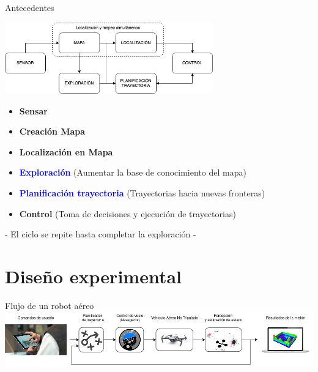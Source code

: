 \documentclass[24pt,aspectratio=169]{beamer}
\begin{document}
\begin{frame}{Antecedentes}

  \centering
  \bigskip %
  \includegraphics[width=9cm]{exploracion}\\
  
  \begin{itemize}
  \item \textbf{Sensar}
  \item \textbf{Creación Mapa} 
  \item \textbf{Localización en Mapa}
  \item \textbf{\textcolor{blue}{Exploración}} (Aumentar la base de conocimiento del mapa)
  \item \textbf{\textcolor{blue}{Planificación trayectoria}} (Trayectorias hacia nuevas fronteras) 
  \item \textbf{Control} (Toma de decisiones y ejecución de trayectorias)
  \end{itemize}
  
  \alert{- El ciclo se repite hasta completar la exploración -}

\end{frame}

\section{Diseño experimental}

\begin{frame}{Flujo de un robot aéreo}
  \centering
  \bigskip %
  \includegraphics[width=14cm]{drone_loop}\\
\end{frame}
\end{document}

